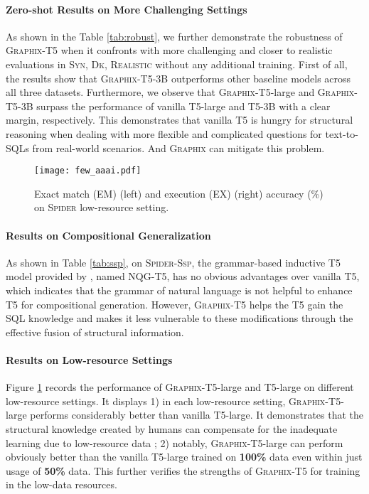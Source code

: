 \documentclass[letterpaper]{article} \usepackage{aaai23}  \usepackage{times}  \usepackage{helvet}  \usepackage{courier}  \usepackage[hyphens]{url}  \usepackage{graphicx} \usepackage{amsmath}
\newcommand{\graphix}{\textsc{Graphix}\xspace}
\newcommand{\spider}{\textsc{Spider}\xspace}
\begin{document}
\paragraph{Zero-shot Results on More Challenging Settings}
As shown in the Table \ref{tab:robust}, we further demonstrate the robustness of \graphix-T5 when it confronts with more challenging and closer to realistic evaluations in \textsc{Syn}, \textsc{Dk}, \textsc{Realistic} without any additional training. First of all, the results show that \graphix-T5-3B outperforms other baseline models across all three datasets. Furthermore, we observe that \graphix-T5-large and \graphix-T5-3B surpass the performance of vanilla T5-large and T5-3B with a clear margin, respectively. This demonstrates that vanilla T5 is hungry for structural reasoning when dealing with more flexible and complicated questions for text-to-SQLs from real-world scenarios. And \graphix can mitigate this problem.
\begin{figure}
    \centering
    \texttt{[image: few\_aaai.pdf]}
    \caption{Exact match ({EM}) (left) and execution ({EX}) (right) accuracy (\%) on \spider low-resource setting.}
    \label{few}
    \vspace{-0.4cm}
\end{figure}

\paragraph{Results on Compositional Generalization}
As shown in Table \ref{tab:ssp}, on \textsc{Spider-Ssp}, the grammar-based inductive T5 model provided by \citep{shaw-etal-2021-compositional}, named NQG-T5, has no obvious advantages over vanilla T5, which indicates that the grammar of natural language is not helpful to enhance T5 for compositional generation. However, \graphix-T5 helps the T5 gain the SQL knowledge and makes it less vulnerable to these modifications through the effective fusion of structural information.



\paragraph{Results on Low-resource Settings}
Figure \ref{few} records the performance of \graphix-T5-large and T5-large on different low-resource settings.
It displays 1) in each low-resource setting, \graphix-T5-large performs considerably better than vanilla T5-large. It demonstrates that the structural knowledge created by humans can compensate for the inadequate learning due to low-resource data \citep{ontology}; 2) notably, \graphix-T5-large can perform obviously better than the vanilla T5-large trained on \textbf{100\%} data even within just usage of \textbf{50\%} data. This further verifies the strengths of \graphix-T5 for training in the low-data resources.
\end{document}
